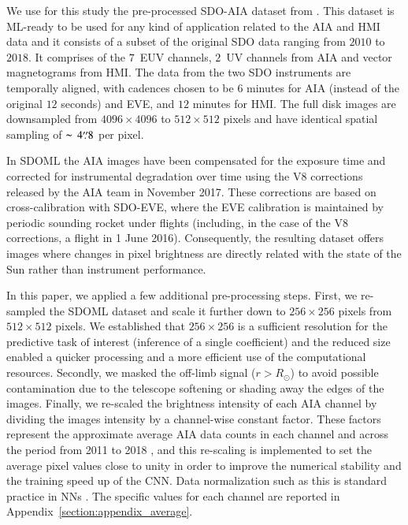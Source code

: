 \documentclass{aa}
\begin{document}
We use for this study the pre-processed SDO-AIA dataset from \citet[][hereafter referred to as SDOML]{SDOML}. This dataset is ML-ready to be used for any kind of application related to the AIA and HMI data and it consists of a subset of the original SDO data ranging from $2010$ to $2018$. It comprises of the $7$~EUV channels, $2$~UV channels from AIA and vector magnetograms from HMI. The data from the two SDO instruments are temporally aligned, with cadences chosen to be $6$ minutes for AIA (instead of the original $12$ seconds) and EVE, and $12$ minutes for HMI. The full disk images are downsampled from $4096 \times 4096$ to $512 \times 512$ pixels and have identical spatial sampling of $\thicksim$ $4\overset{\prime\prime}{.}8$ per pixel. 

In SDOML the AIA images have been compensated for the exposure time and corrected for instrumental degradation over time using the V8 corrections released by the AIA team in November 2017. These corrections are based on cross-calibration with SDO-EVE, where the EVE calibration is maintained by periodic sounding rocket under flights (including, in the case of the V8 corrections, a flight in 1 June 2016). Consequently, the resulting dataset offers images where changes in pixel brightness are directly related with the state of the Sun rather than instrument performance.

In this paper, we applied a few additional pre-processing steps. First, we re-sampled the SDOML dataset and scale it further down to $256\times256$ pixels from $512\times512$ pixels. We established that $256\times256$ is a sufficient resolution for the predictive task of interest (inference of a single coefficient) and the reduced size enabled a quicker processing and a more efficient use of the computational resources. Secondly, we masked the off-limb signal ($r>R_\odot$) to avoid possible contamination due to the telescope softening or shading away the edges of the images. Finally, we re-scaled the brightness intensity of each AIA channel by dividing the images intensity by a channel-wise constant factor. These factors represent the approximate average AIA data counts in each channel and across the period from 2011 to 2018 \citep[derived from][]{SDOML}, and this re-scaling is implemented to set the average pixel values close to unity in order to improve the numerical stability and the training speed up of the CNN. Data normalization such as this is standard practice in NNs \citep{goodfellow2016deep}. The specific values for each channel are reported in Appendix~\ref{section:appendix_average}.
\end{document}
